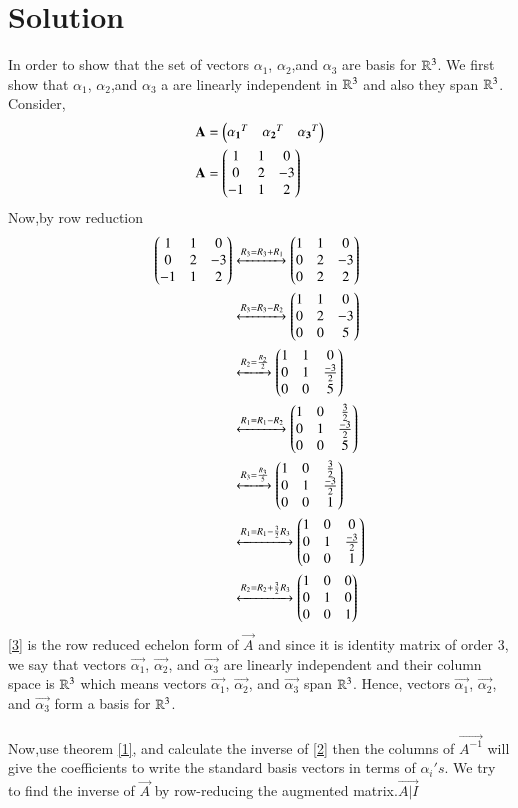 \documentclass[journal,12pt,twocolumn]{IEEEtran}
\begin{document}
\section{Solution}
In order to show that the set of vectors $\alpha_1$, $\alpha_2$,and $\alpha_3$  are basis for $\mathbb{R}^3$. We first show that $\alpha_1$, $\alpha_2$,and $\alpha_3$ a  are linearly independent in $\mathbb{R}^3$ and also they span $\mathbb{R}^3$. Consider,
\begin{align}
& \mathbf{A} = \begin{pmatrix}\mathbf{\alpha_1}^T & \mathbf{\alpha_2}^T & \mathbf{\alpha_3}^T \end{pmatrix} \\
& \mathbf{A} = \begin{pmatrix}1 & 1 &  0 \\ 0 & 2 & -3  \\ -1 & 1 & 2 \end{pmatrix}\label{2}
\end{align}
Now,by row reduction
\begin{align}
\begin{pmatrix}1 & 1 &  0 \\ 0 & 2 & -3  \\ -1 & 1 & 2\end{pmatrix} &\xleftrightarrow[]{R_3=R_3+R_1}\begin{pmatrix}1 & 1 &  0 \\ 0 & 2 & -3  \\ 0 & 2 & 2  \end{pmatrix} \\
 &\xleftrightarrow[]{R_3=R_3-R_2}\begin{pmatrix}1 & 1 &  0 \\ 0 & 2 & -3  \\ 0 & 0 & 5  \end{pmatrix} \\
&\xleftrightarrow[]{R_2=\frac{R_2}{2}}\begin{pmatrix}1 & 1 &  0 \\ 0 & 1 &\frac{-3}{2}   \\ 0 & 0 & 5  \end{pmatrix} \\
&\xleftrightarrow[]{R_1=R_1-R_2}\begin{pmatrix}1 & 0 &  \frac{3}{2} \\ 0 & 1 &\frac{-3}{2}   \\ 0 & 0 & 5  \end{pmatrix} \\
&\xleftrightarrow[]{R_3=\frac{R_3}{5}}\begin{pmatrix}1 & 0 &   \frac{3}{2} \\ 0 & 1 & \frac{-3}{2}   \\ 0 & 0 & 1  \end{pmatrix} \\
&\xleftrightarrow[]{R_1=R_1-\frac{3}{2}R_3}\begin{pmatrix}1 & 0 &  0 \\ 0 & 1 & \frac{-3}{2}   \\ 0 & 0 & 1  \end{pmatrix} \\
&\xleftrightarrow[]{R_2=R_2+\frac{3}{2}R_3}\begin{pmatrix}1 & 0 &  0 \\ 0 & 1 & 0  \\ 0 & 0 & 1  \end{pmatrix} \label{3}
\end{align}
\eqref{3} is the row reduced echelon form of $\vec{A}$ and since it is identity matrix of order 3, we say that vectors $\vec{\alpha_1}$, $\vec{\alpha_2}$, and $\vec{\alpha_3}$  are linearly independent and their column space is $\mathbb{R}^3$ which means vectors $\vec{\alpha_1}$, $\vec{\alpha_2}$, and $\vec{\alpha_3}$  span $\mathbb{R}^3$.
Hence, vectors $\vec{\alpha_1}$, $\vec{\alpha_2}$, and $\vec{\alpha_3}$ form a basis for $\mathbb{R}^3$.\\\\
Now,use theorem \eqref{1}, and calculate the inverse of \eqref{2}
then the columns of $\vec{A^{-1}}$ will give the coefficients to write the standard basis vectors in terms of $\alpha_i's$. We try to find the inverse of $\vec{A}$ by row-reducing the augmented matrix.$\vec{A|I}$ 
\end{document}

